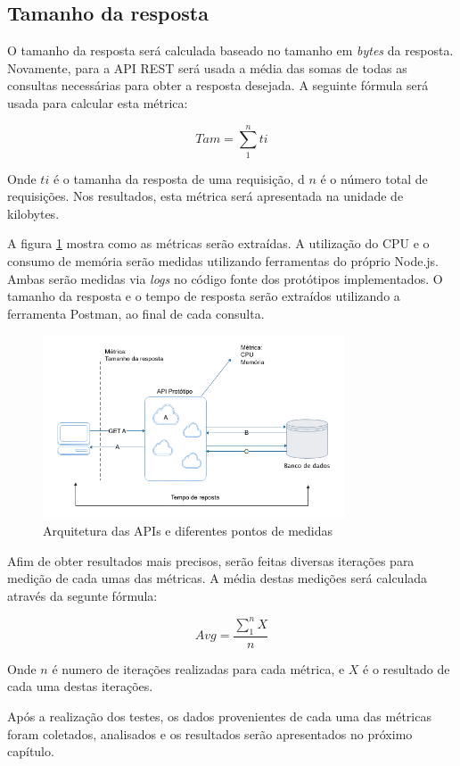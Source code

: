 \subsection*{Tamanho da resposta}

O tamanho da resposta será calculada baseado no tamanho em \textit{bytes} da resposta. Novamente, para a API REST será usada a média das somas de todas as consultas necessárias para obter a resposta desejada. A seguinte fórmula será usada para calcular esta métrica: 

$$ Tam = \sum\limits_{1}^{n} ti $$

Onde $ti$ é o tamanha da resposta de uma requisição, d $n$ é o número total de requisições. Nos resultados, esta métrica será apresentada na unidade de kilobytes.

A figura \ref{fig:my-metrics} mostra como as métricas serão extraídas. A utilização do CPU e o consumo de memória serão medidas utilizando ferramentas do próprio Node.js. Ambas serão medidas via \textit{logs} no código fonte dos protótipos implementados. O tamanho da resposta e o tempo de resposta serão extraídos utilizando a ferramenta Postman, ao final de cada consulta.

\begin{figure}[htbp]
\centering
\includegraphics[width=0.8\textwidth]{figuras/metricas.png}
\caption{Arquitetura das APIs e diferentes pontos de medidas}
\label{fig:my-metrics}
\author{fonte: Autor}
\end{figure}

Afim de obter resultados mais precisos, serão feitas diversas iterações para medição de cada umas das métricas. A média destas medições será calculada através da segunte fórmula: 

$$ Avg = \frac{\sum\limits_{1}^{n} X}{n} $$

Onde $n$ é numero de iterações realizadas para cada métrica, e $X$ é o resultado de cada uma destas iterações.

Após a realização dos testes, os dados provenientes de cada uma das métricas foram coletados, analisados e os resultados serão apresentados no próximo capítulo. 